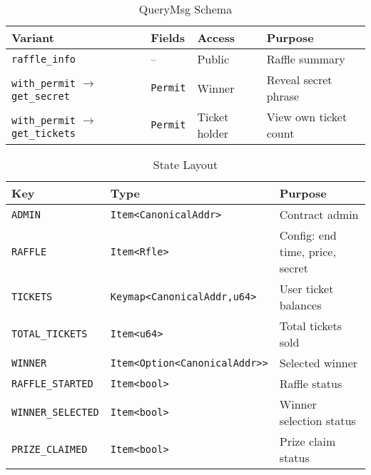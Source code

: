 \documentclass{article}
\begin{document}
\begin{table}[h]
  \centering
  \caption{QueryMsg Schema}
  \label{tab:QueryMsg Schema}
  \begin{tabular}{@{}llll@{}}
    \toprule
    \textbf{Variant} & \textbf{Fields} & \textbf{Access} & \textbf{Purpose} \\
    \midrule
    \texttt{raffle\_info} & -- & Public & Raffle summary \\
    \midrule
    \texttt{with\_permit} $\rightarrow$ \texttt{get\_secret} & \texttt{Permit} & Winner & Reveal secret phrase \\
    \midrule
    \texttt{with\_permit} $\rightarrow$ \texttt{get\_tickets} & \texttt{Permit} & Ticket holder & View own ticket count \\
    \bottomrule
  \end{tabular}
\end{table}

\begin{table}[h]
  \centering
  \caption{State Layout}
  \label{tab:State Layout}
  \begin{tabular}{@{}lll@{}}
    \toprule
    \textbf{Key} & \textbf{Type} & \textbf{Purpose} \\
    \midrule
    \texttt{ADMIN} & \texttt{Item<CanonicalAddr>} & Contract admin \\
    \texttt{RAFFLE} & \texttt{Item<Rfle>} & Config: end time, price, secret \\
    \texttt{TICKETS} & \texttt{Keymap<CanonicalAddr,u64>} & User ticket balances \\
    \texttt{TOTAL\_TICKETS} & \texttt{Item<u64>} & Total tickets sold \\
    \texttt{WINNER} & \texttt{Item<Option<CanonicalAddr>>} & Selected winner \\
    \texttt{RAFFLE\_STARTED} & \texttt{Item<bool>} & Raffle status \\
    \texttt{WINNER\_SELECTED} & \texttt{Item<bool>} & Winner selection status \\
    \texttt{PRIZE\_CLAIMED} & \texttt{Item<bool>} & Prize claim status \\
    \bottomrule
\end{tabular}
\end{table}

\newpage
\end{document}
